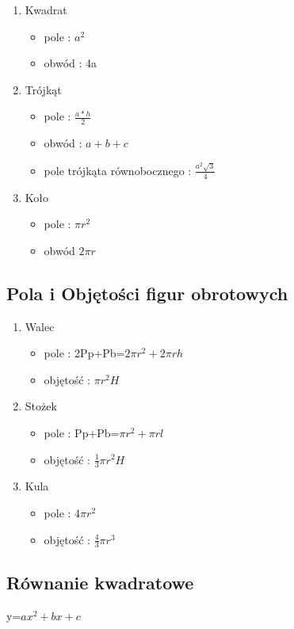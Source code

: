 \documentclass[a4paper]{article}
\begin{document}
\begin{enumerate}
	\item Kwadrat
		\begin{itemize}
			\item pole : $a^{2}$ 
			\item obwód : 4a 
		\end{itemize}
	\item Trójkąt
		\begin{itemize}
			\item pole : $\frac{a*h}{2}$ 
			\item obwód : $a+b+c$ 
			\item pole trójkąta równobocznego : $\frac{a^{2}\sqrt{3}}{4}$ 
		\end{itemize} 			
	\item Koło
		\begin{itemize}
			\item pole : $\pi r^{2}$ 
			\item obwód  $2\pi r$ 
		\end{itemize}
\end{enumerate}

\subsection{Pola i Objętości figur obrotowych}
\begin{enumerate}
	\item Walec
		\begin{itemize}
			\item pole : 2Pp+Pb=$2\pi r^{2}+2\pi rh$ 
			\item objętość : $\pi r^{2}H$ 
		\end{itemize}
	\item Stożek
		\begin{itemize}
			\item pole : Pp+Pb=$\pi r^{2}+\pi rl$ 
			\item objętość : $\frac{1}{3}\pi r^{2}H$ 
		\end{itemize} 			
	\item Kula
		\begin{itemize}
			\item pole : $4\pi r^{2}$ 
			\item objętość :  $\frac{4}{3}\pi r^{3}$ 
		\end{itemize}
\end{enumerate}
\subsection{Równanie kwadratowe}
y=$ax^{2}+bx+c$
\label{wzór}
\end{document}
